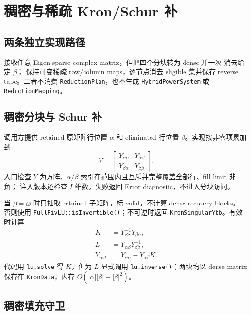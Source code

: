 
\section{稠密与稀疏 Kron/Schur 补}\label{sec:gr-kron}

\subsection{两条独立实现路径}

 接收任意 Eigen sparse complex matrix，但把四个分块转为 dense 并一次
消去给定 $\beta$； 保持可变稀疏 row/column maps，逐节点消去
eligible 集并保存 reverse tape。二者不消费 \texttt{ReductionPlan}，也不生成
\texttt{HybridPowerSystem} 或 \texttt{ReductionMapping}。

\subsection{稠密分块与 Schur 补}

调用方提供 retained 原矩阵行位置 $\alpha$ 和 eliminated 行位置 $\beta$。实现按非零项累加到
\begin{equation}
Y=\begin{bmatrix}Y_{\alpha\alpha}&Y_{\alpha\beta}\\
Y_{\beta\alpha}&Y_{\beta\beta}\end{bmatrix}.
\end{equation}
入口检查 $Y$ 为方阵、$\alpha/\beta$ 索引在范围内且互斥并完整覆盖全部行、fill limit 非负；
注入版本还检查 $I$ 维数。失败返回 Error diagnostic，不进入分块访问。

当 $\beta=\varnothing$ 时只抽取 retained 子矩阵，标 valid，不计算 dense recovery blocks。
否则使用 \texttt{FullPivLU::isInvertible()}；不可逆时返回
\texttt{KronSingularYbb}。有效时计算
\begin{align}
K&=Y_{\beta\beta}^{-1}Y_{\beta\alpha},\\
L&=Y_{\alpha\beta}Y_{\beta\beta}^{-1},\\
Y_{red}&=Y_{\alpha\alpha}-Y_{\alpha\beta}K.
\end{align}
代码用 \texttt{lu.solve} 得 $K$，但为 $L$ 显式调用 \texttt{lu.inverse()}；两块均以 dense matrix
保存在 \texttt{KronData}，内存 $O(|\alpha||\beta|+|\beta|^2)$。

\subsection{稠密填充守卫}

